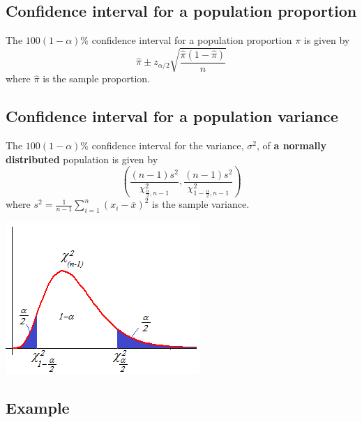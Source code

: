 \documentclass[
]{article}
\begin{document}
\hypertarget{confidence-interval-for-a-population-proportion}{%
\subsection{Confidence interval for a population
proportion}\label{confidence-interval-for-a-population-proportion}}

The \(100(1-\alpha)\%\) confidence interval for a population proportion
\(\pi\) is given by
\[\hat{\pi}\pm z_{\alpha/2} \sqrt{\frac{\hat{\pi}(1-\hat{\pi})}{n}} \]
where \(\hat{\pi}\) is the sample proportion.

\hypertarget{confidence-interval-for-a-population-variance}{%
\subsection{Confidence interval for a population
variance}\label{confidence-interval-for-a-population-variance}}

The \(100(1-\alpha)\%\) confidence interval for the variance,
\(\sigma^2\), of \textbf{a normally distributed} population is given by
\[\left(\frac{(n-1)s^2}{\chi^2_{\frac{\alpha}{2}, n-1}}, \frac{(n-1)s^2}{\chi^2_{1-\frac{\alpha}{2}, n-1}}\right)\]
where \(s^2=\frac{1}{n-1}\sum_{i=1}^{n}(x_i-\bar{x})^2\) is the sample
variance.

\begin{center}\includegraphics[width=1\linewidth,height=1\textheight]{chidist1} \end{center}

\hypertarget{example-2}{%
\subsection{Example}\label{example-2}}
\end{document}
